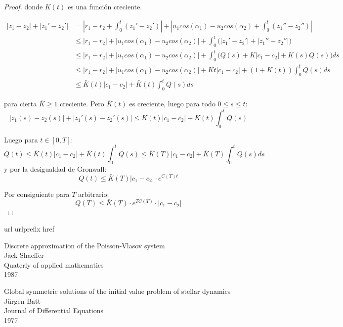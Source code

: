 \documentclass[a4paper,10pt]{scrartcl}
\theoremstyle{definition}
\numberwithin{equation}{section}
\begin{document}
\begin{proof}
 donde $K(t)$ es una función creciente.
 
 \begin{align*}
  |z_1 - z_2| + |z_1' - z_2'| &= \left|r_1 - r_2 + \int_0^t (z_1' - z_2')\right| + \left|u_1 cos(\alpha_1) - u_2 cos(\alpha_2) + \int_0^t (z_1'' - z_2'') \right|\\
  &\le |r_1 - r_2| + |u_1 cos(\alpha_1) - u_2 cos(\alpha_2)| + \int_0^t \bigg(|z_1' - z_2'| + |z_1'' - z_2''|\bigg) \\
  &\le |r_1 - r_2| + |u_1 cos(\alpha_1) - u_2 cos(\alpha_2)| + \int_0^t \bigg(Q(s) + K|c_1 - c_2| + K(s)Q(s)\bigg) ds \\
  &\le |r_1 - r_2| + |u_1 cos(\alpha_1) - u_2 cos(\alpha_2)| + Kt|c_1 - c_2| + (1 + K(t)) \int_0^t Q(s) ds\\
  &\le \bar{K}(t)|c_1 - c_2| + \bar{K}(t) \int_0^t Q(s) ds
 \end{align*}

 para cierta $\bar{K} \ge 1$ creciente. Pero $\bar{K}(t)$ es creciente, luego para todo $0 \le s \le t$:
 \[
    |z_1(s) - z_2(s)| + |z_1'(s) - z_2'(s)|  \le \bar{K}(t)|c_1 - c_2| + \bar{K}(t) \int_0^t Q(s)
 \]

 Luego para $t\in [0,T]$:
 \[
  Q(t) \le \bar{K}(t)|c_1 - c_2| + \bar{K}(t) \int_0^t Q(s) \le \bar{K}(T)|c_1 - c_2| + \bar{K}(T) \int_0^t Q(s)ds
 \]
 y por la desigualdad de Gronwall:
 \[
  Q(t) \le \bar{K}(T)|c_1 - c_2| \cdot e^{C(T)t}
 \]
 
 Por consiguiente para $T$ arbitrario:
 \[
  Q(T) \le \bar{K}(T)\cdot e^{TC(T)} \cdot |c_1 - c_2|
 \]
 
\end{proof}

\newpage
\begin{thebibliography}{10}
    \expandafter\ifx\csname url\endcsname\relax
    \def\url#1{\texttt{#1}}\fi
    \expandafter\ifx\csname urlprefix\endcsname\relax\def\urlprefix{URL }\fi
    \expandafter\ifx\csname href\endcsname\relax
    \def\href#1#2{#2} \def\path#1{#1}\fi
    
    Discrete approximation of the Poisson-Vlasov system\\
    Jack Shaeffer\\
    Quaterly of applied mathematics\\
    1987
    
    Global symmetric solutions of the initial value problem of stellar dynamics\\
    Jürgen Batt\\
    Journal of Differential Equations\\
    1977
\end{thebibliography}
	
\end{document}
